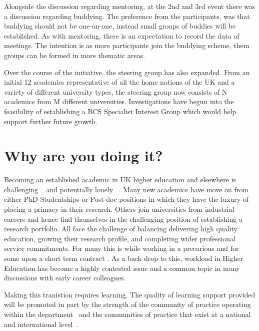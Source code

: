 \documentclass[sigconf]{acmart}
\begin{document}
Alongside the discussion regarding mentoring, at the 2nd and 3rd event there was a discussion regarding buddying. The preference from the participants, was that buddying should not be one-on-one, instead small groups of buddies will be established. As with mentoring, there is an expectation to record the data of meetings. The intention is as more participants join the buddying scheme, them groups can be formed in more thematic areas. 

Over the course of the initiative, the steering group has also expanded. From an initial 12 academics representative of all the home nations of the UK and a variety of different university types, the steering group now consists of N academics from M different universities. Investigations have begun into the feasibility of establishing a BCS Specialist Interest Group \cite{BCSSIG} which would help support further future growth.




\section{Why are you doing it?}
Becoming an established academic in UK higher education and elsewhere is challenging ~\cite{Thomas2015} and potentially lonely ~\cite{Foote2009}. Many new academics have move on from either PhD Studentships or Post-doc positions in which they have the luxury of placing a primacy in their research. Others join universities from industrial careers and hence find themselves in the challenging position of establishing a research portfolio. All face the challenge of balancing delivering high quality education, growing their research profile, and completing wider professional service commitments. For many this is while working in a precarious and for some upon a short term contract \cite{UCU,JaffeS}. As a back drop to this, workload in Higher Education has become a highly contested issue \cite{UCU2016}and a common topic in many discussions with early career colleagues.

Making this tranistion requires learning. The quality of learning support provided will be promoted in part by the strength of the community of practice operating within the department~\cite{Bolander2008} and the communities of practice that exist at a national and international level~\cite{Thomas2015}.

\label{sec:Why}
\end{document}
